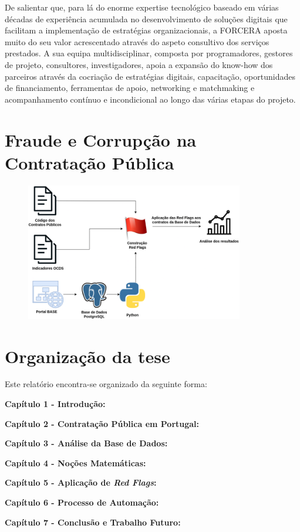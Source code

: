 De salientar que, para lá do enorme expertise tecnológico baseado em várias décadas de experiência acumulada no desenvolvimento de soluções digitais que facilitam a implementação de estratégias organizacionais, a FORCERA aposta muito do seu valor acrescentado através do aspeto consultivo dos serviços prestados. A sua equipa multidisciplinar, composta por programadores, gestores de projeto, consultores, investigadores, apoia a expansão do know-how dos parceiros através da cocriação de estratégias digitais, capacitação, oportunidades de financiamento, ferramentas de apoio, networking e matchmaking e acompanhamento contínuo e incondicional ao longo das várias etapas do projeto.



\section{Fraude e Corrupção na Contratação Pública}


\begin{figure}[H]
	\centering
	\includegraphics[width=0.85\textwidth]{imagens/processo_tese.png}
	\caption{}
	\label{}
\end{figure}





\section{Organização da tese}

Este relatório encontra-se organizado da seguinte forma: 

\textbf{Capítulo 1 - Introdução:}

\textbf{Capítulo 2 - Contratação Pública em Portugal:}

\textbf{Capítulo 3 - Análise da Base de Dados:}

\textbf{Capítulo 4 - Noções Matemáticas:}

\textbf{Capítulo 5 - Aplicação de \textit{Red Flags}:}

\textbf{Capítulo 6 - Processo de Automação:}

\textbf{Capítulo 7 - Conclusão e Trabalho Futuro:}

